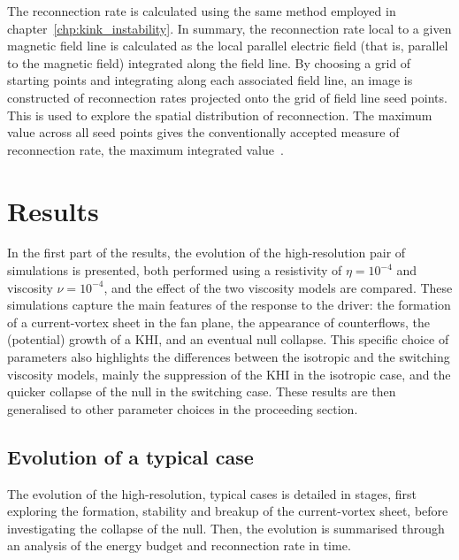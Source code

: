 The reconnection rate is calculated using the same method employed in chapter~\ref{chp:kink_instability}. In summary, the reconnection rate local to a given magnetic field line is calculated as the local parallel electric field (that is, parallel to the magnetic field) integrated along the field line. By choosing a grid of starting points and integrating along each associated field line, an image is constructed of reconnection rates projected onto the grid of field line seed points. This is used to explore the spatial distribution of reconnection. The maximum value across all seed points gives the conventionally accepted measure of reconnection rate, the maximum integrated value~\cite{galsgaardSteadyStateReconnection2011,priestNatureThreedimensionalMagnetic2003,schindlerGeneralMagneticReconnection1988}.

\section{Results}

\label{sec:khi_results}

In the first part of the results, the evolution of the high-resolution pair of simulations is presented, both performed using a resistivity of $\eta = 10^{-4}$ and viscosity $\nu = 10^{-4}$, and the effect of the two viscosity models are compared. These simulations capture the main features of the response to the driver: the formation of a current-vortex sheet in the fan plane, the appearance of counterflows, the (potential) growth of a KHI, and an eventual null collapse. This specific choice of parameters also highlights the differences between the isotropic and the switching viscosity models, mainly the suppression of the KHI in the isotropic case, and the quicker collapse of the null in the switching case. These results are then generalised to other parameter choices in the proceeding section.

\subsection{Evolution of a typical case}
\label{sec:null_point_khi_single_case}

The evolution of the high-resolution, typical cases is detailed in stages, first exploring the formation, stability and breakup of the current-vortex sheet, before investigating the collapse of the null. Then, the evolution is summarised through an analysis of the energy budget and reconnection rate in time.

